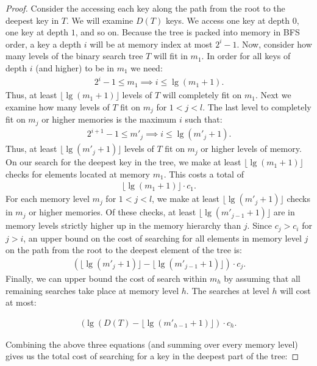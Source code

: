 \documentclass[]{beamer}
\theoremstyle{plain}
\begin{document}
\begin{frame}
\begin{proof}
Consider the accessing each key along the path from the root to the deepest key in $T$. We will examine $D(T)$ keys. We access one key at depth $0$, one key at depth $1$, and so on. Because the tree is packed into memory in BFS order, a key a depth $i$ will be at memory index at most $2^i-1$. Now, consider how many levels of the binary search tree $T$ will fit in $m_1$. In order for all keys of depth $i$ (and higher) to be in $m_1$ we need:
\begin{align*}
2^i-1 \leq m_1 \implies i \leq \lg(m_1 + 1).
\end{align*}
Thus, at least $\lfloor \lg(m_1 + 1) \rfloor$ levels of $T$ will completely fit on $m_1$. Next we examine how many levels of $T$ fit on $m_j$ for $1 < j < l$. The last level to completely fit on $m_j$ or higher memories is the maximum $i$ such that:
\begin{align*}
2^{i+1}-1 \leq m'_j \implies i \leq \lg(m'_j + 1).
\end{align*}
Thus, at least $\lfloor \lg(m'_j + 1) \rfloor$ levels of $T$ fit on $m_j$ or higher levels of memory.
On our search for the deepest key in the tree, we make at least $\lfloor \lg(m_1 + 1) \rfloor$ checks for elements located at memory $m_1$. This costs a total of
\begin{align*}
\lfloor \lg(m_1 + 1) \rfloor \cdot c_1.
\end{align*}
For each memory level $m_j$ for $1 < j < l$, we make at least $\lfloor \lg(m'_j + 1) \rfloor$ checks in $m_j$ or higher memories. Of these checks, at least $\lfloor \lg(m'_{j-1} + 1) \rfloor$ are in memory levels strictly higher up in the memory hierarchy than $j$. Since $c_j > c_i$ for $j > i$, an upper bound on the cost of searching for all elements in memory level $j$ on the path from the root to the deepest element of the tree is:
\begin{align*}
(\lfloor \lg(m'_j + 1) \rfloor - \lfloor \lg(m'_{j-1} + 1) \rfloor) \cdot c_j.
\end{align*}
Finally, we can upper bound the cost of search within $m_h$ by assuming that all remaining searches take place at memory level $h$. The searches at level $h$ will cost at most:

\begin{align*}
(\lg(D(T) - \lfloor \lg(m'_{h-1}+1) \rfloor)\cdot c_h.
\end{align*}

Combining the above three equations (and summing over every memory level) gives us the total cost of searching for a key in the deepest part of the tree:


\end{proof}
\end{frame}
\end{document}

